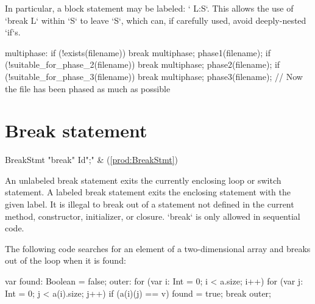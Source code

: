 In particular, a block statement may be labeled: \xcd` L:{S}`.  This allows
the use of \xcd`break L` within \xcd`S` to leave \xcd`S`, which can, if
carefully used, avoid deeply-nested \xcd`if`s. 

\begin{ex}
\begin{xten}
multiphase: {
  if (!exists(filename)) break multiphase;
  phase1(filename);
  if (!suitable_for_phase_2(filename)) break multiphase;
  phase2(filename);
  if (!suitable_for_phase_3(filename)) break multiphase;
  phase3(filename);
}
// Now the file has been phased as much as possible
\end{xten}
\end{ex}


\section{Break statement}

\begin{bbgrammar}
           BreakStmt \: \xcd"break" Id\opt \xcd";" & (\ref{prod:BreakStmt}) \\
\end{bbgrammar}


An unlabeled break statement exits the currently enclosing loop or switch
statement. A labeled break statement exits the enclosing 
statement with the given label.
It is illegal to break out of a statement not defined in the current
method, constructor, initializer, or closure.  
\xcd`break` is only allowed in sequential code.

\begin{ex}
The following code searches for an element of a two-dimensional
array and breaks out of the loop when it is found:
\begin{xten}
var found: Boolean = false;
outer: for (var i: Int = 0; i < a.size; i++)
    for (var j: Int = 0; j < a(i).size; j++)
        if (a(i)(j) == v) {
            found = true;
            break outer;
        }
\end{xten}
\end{ex}

